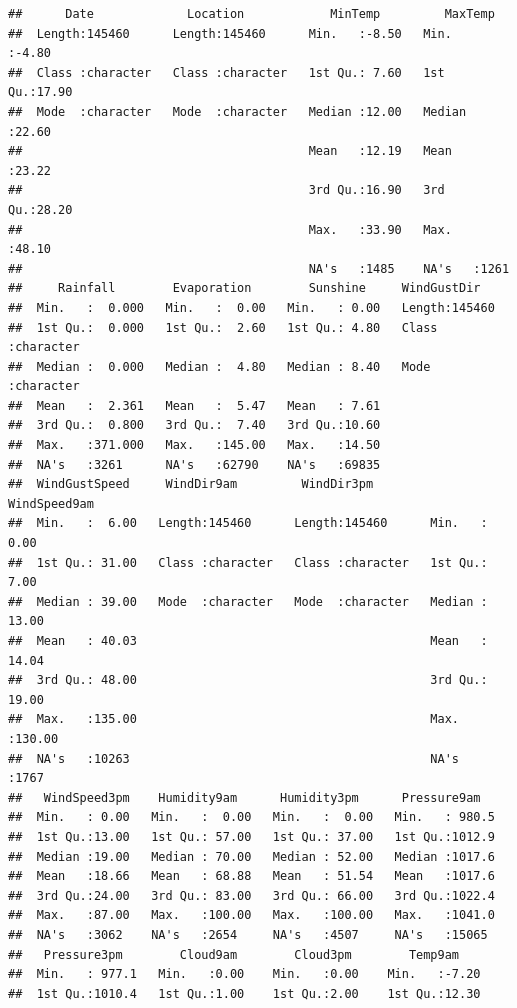 \documentclass[
]{article}
\begin{document}
\begin{verbatim}
##      Date             Location            MinTemp         MaxTemp     
##  Length:145460      Length:145460      Min.   :-8.50   Min.   :-4.80  
##  Class :character   Class :character   1st Qu.: 7.60   1st Qu.:17.90  
##  Mode  :character   Mode  :character   Median :12.00   Median :22.60  
##                                        Mean   :12.19   Mean   :23.22  
##                                        3rd Qu.:16.90   3rd Qu.:28.20  
##                                        Max.   :33.90   Max.   :48.10  
##                                        NA's   :1485    NA's   :1261   
##     Rainfall        Evaporation        Sunshine     WindGustDir       
##  Min.   :  0.000   Min.   :  0.00   Min.   : 0.00   Length:145460     
##  1st Qu.:  0.000   1st Qu.:  2.60   1st Qu.: 4.80   Class :character  
##  Median :  0.000   Median :  4.80   Median : 8.40   Mode  :character  
##  Mean   :  2.361   Mean   :  5.47   Mean   : 7.61                     
##  3rd Qu.:  0.800   3rd Qu.:  7.40   3rd Qu.:10.60                     
##  Max.   :371.000   Max.   :145.00   Max.   :14.50                     
##  NA's   :3261      NA's   :62790    NA's   :69835                     
##  WindGustSpeed     WindDir9am         WindDir3pm         WindSpeed9am   
##  Min.   :  6.00   Length:145460      Length:145460      Min.   :  0.00  
##  1st Qu.: 31.00   Class :character   Class :character   1st Qu.:  7.00  
##  Median : 39.00   Mode  :character   Mode  :character   Median : 13.00  
##  Mean   : 40.03                                         Mean   : 14.04  
##  3rd Qu.: 48.00                                         3rd Qu.: 19.00  
##  Max.   :135.00                                         Max.   :130.00  
##  NA's   :10263                                          NA's   :1767    
##   WindSpeed3pm    Humidity9am      Humidity3pm      Pressure9am    
##  Min.   : 0.00   Min.   :  0.00   Min.   :  0.00   Min.   : 980.5  
##  1st Qu.:13.00   1st Qu.: 57.00   1st Qu.: 37.00   1st Qu.:1012.9  
##  Median :19.00   Median : 70.00   Median : 52.00   Median :1017.6  
##  Mean   :18.66   Mean   : 68.88   Mean   : 51.54   Mean   :1017.6  
##  3rd Qu.:24.00   3rd Qu.: 83.00   3rd Qu.: 66.00   3rd Qu.:1022.4  
##  Max.   :87.00   Max.   :100.00   Max.   :100.00   Max.   :1041.0  
##  NA's   :3062    NA's   :2654     NA's   :4507     NA's   :15065   
##   Pressure3pm        Cloud9am        Cloud3pm        Temp9am     
##  Min.   : 977.1   Min.   :0.00    Min.   :0.00    Min.   :-7.20  
##  1st Qu.:1010.4   1st Qu.:1.00    1st Qu.:2.00    1st Qu.:12.30  

\end{verbatim}
\end{document}
